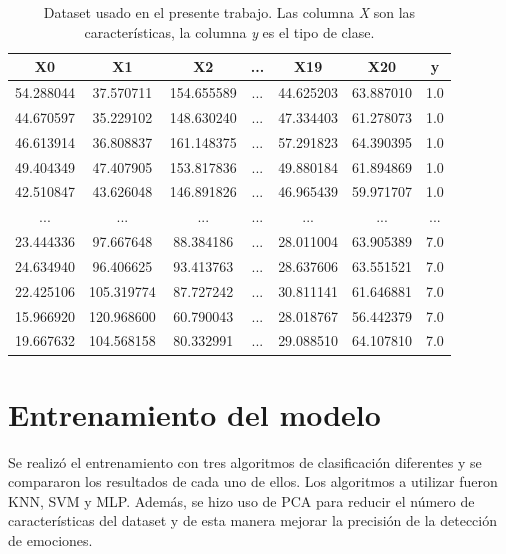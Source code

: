 \begin{table}[H]
\begin{center}
\begin{tabular}{|c|c|c|c|c|c|c|}
     \hline
    \textbf{X0} & \textbf{X1} & \textbf{X2} & \textbf{...} & \textbf{X19} & \textbf{X20} & \textbf{y}\\
    \hline
    54.288044 & 37.570711 & 154.655589 & ... & 44.625203 & 63.887010 & 1.0\\ 
    44.670597 & 35.229102 & 148.630240 & ... & 47.334403 & 61.278073 & 1.0\\
    46.613914 & 36.808837 & 161.148375 & ... & 57.291823 & 64.390395 & 1.0\\
    49.404349 & 47.407905 & 153.817836 & ... & 49.880184 & 61.894869 & 1.0\\
    42.510847 & 43.626048 & 146.891826 & ... & 46.965439 & 59.971707 & 1.0\\
    ... & ... & ... & ... & ... & ... & ...\\
    23.444336 & 97.667648 & 88.384186 & ... & 28.011004 & 63.905389 & 7.0\\
    24.634940 & 96.406625 & 93.413763 & ... & 28.637606 & 63.551521 & 7.0\\
    22.425106 & 105.319774 & 87.727242 & ... & 30.811141 & 61.646881 & 7.0\\
    15.966920 & 120.968600 & 60.790043 & ... & 28.018767 & 56.442379 & 7.0\\
    19.667632 & 104.568158 & 80.332991 & ... & 29.088510 & 64.107810 & 7.0\\
     \hline
 \end{tabular}
 \captionsetup{justification=centering}
\caption{Dataset usado en el presente trabajo. Las columna \textit{X} son las características, la columna \textit{y} es el tipo de clase.}
\label{cuadro:dataset}
\end{center}
\end{table}

\section{Entrenamiento del modelo}
\label{sec:entrenamiento}

Se realizó el entrenamiento con tres algoritmos de clasificación diferentes y se compararon los resultados de cada uno de ellos. Los algoritmos a utilizar fueron KNN, SVM y MLP. Además, se hizo uso de PCA para reducir el número de características del dataset y de esta manera mejorar la precisión de la detección de emociones.\\

